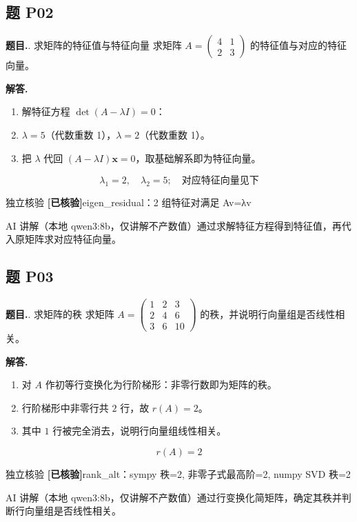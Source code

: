 \documentclass[11pt]{article}
\newcommand{\okmark}{\textcolor{okgreen}{\textbf{[已核验]}}}
\begin{document}
\subsection*{题 P02}
\noindent\textbf{题目.}. 求矩阵的特征值与特征向量
求矩阵 $A = \begin{pmatrix} 4 & 1 \\ 2 & 3 \end{pmatrix}$ 的特征值与对应的特征向量。\par
\vspace{4pt}\noindent\textbf{解答.}\quad
\begin{enumerate}[leftmargin=1.6em,itemsep=2pt]
  \item 解特征方程 $\det(A-\lambda I)=0$：
  \item $\lambda = 5$（代数重数 1），$\lambda = 2$（代数重数 1）。
  \item 把 $\lambda$ 代回 $(A-\lambda I)\mathbf{x}=0$，取基础解系即为特征向量。
\end{enumerate}
\[ \boxed{\lambda_{1}=2,\quad \lambda_{2}=5;\quad \text{对应特征向量见下}} \]
\par
\begin{veribox}{独立核验 \okmark}eigen\_residual：2 组特征对满足 Av=λv\end{veribox}
\begin{aibox}{AI 讲解（本地 qwen3:8b，仅讲解不产数值）}通过求解特征方程得到特征值，再代入原矩阵求对应特征向量。\end{aibox}
\vspace{10pt}
\subsection*{题 P03}
\noindent\textbf{题目.}. 求矩阵的秩
求矩阵 $A = \begin{pmatrix} 1 & 2 & 3 \\ 2 & 4 & 6 \\ 3 & 6 & 10 \end{pmatrix}$ 的秩，并说明行向量组是否线性相关。\par
\vspace{4pt}\noindent\textbf{解答.}\quad
\begin{enumerate}[leftmargin=1.6em,itemsep=2pt]
  \item 对 $A$ 作初等行变换化为行阶梯形：非零行数即为矩阵的秩。
  \item 行阶梯形中非零行共 $2$ 行，故 $r(A)=2$。
  \item 其中 $1$ 行被完全消去，说明行向量组线性相关。
\end{enumerate}
\[ \boxed{r(A)=2} \]
\par
\begin{veribox}{独立核验 \okmark}rank\_alt：sympy 秩=2, 非零子式最高阶=2, numpy SVD 秩=2\end{veribox}
\begin{aibox}{AI 讲解（本地 qwen3:8b，仅讲解不产数值）}通过行变换化简矩阵，确定其秩并判断行向量组是否线性相关。\end{aibox}
\vspace{10pt}
\end{document}
